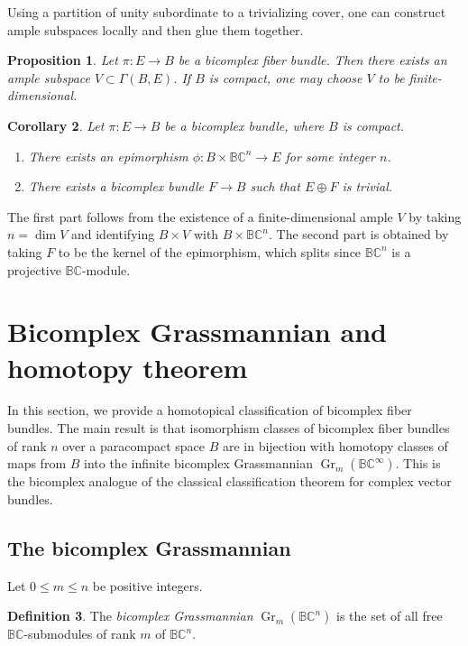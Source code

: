 \documentclass[11pt]{amsart}
\newcommand{\BC}{\mathbb{BC}}       %
\newcommand{\Gr}{\operatorname{Gr}}
\newtheorem{prop}{Proposition}[section]   %
\newtheorem{cor}[prop]{Corollary}         %
\theoremstyle{definition}
\newtheorem{defn}[prop]{Definition}       %
\begin{document}
Using a partition of unity subordinate to a trivializing cover, one can construct ample subspaces locally and then glue them together.

\begin{prop}
    Let $\pi:E \to B$ be a bicomplex fiber bundle. Then there exists an ample subspace $V \subset \Gamma(B,E)$. If $B$ is compact, one may choose $V$ to be finite-dimensional.
\end{prop}

\begin{cor}\label{cor:epimorphism}
    Let $\pi:E \to B$ be a bicomplex bundle, where $B$ is compact.
    \begin{enumerate}
        \item There exists an epimorphism $\phi:B \times \BC^n \to E$ for some integer $n$.
        \item There exists a bicomplex bundle $F \to B$ such that $E \oplus F$ is trivial.
    \end{enumerate}
\end{cor}

The first part follows from the existence of a finite-dimensional ample $V$ by taking $n = \dim V$ and identifying $B \times V$ with $B \times \BC^n$. The second part is obtained by taking $F$ to be the kernel of the epimorphism, which splits since $\BC^n$ is a projective $\BC$-module.


\section{Bicomplex Grassmannian and homotopy theorem}

In this section, we provide a homotopical classification of bicomplex fiber bundles. The main result is that isomorphism classes of bicomplex fiber bundles of rank $n$ over a paracompact space $B$ are in bijection with homotopy classes of maps from $B$ into the infinite bicomplex Grassmannian $\Gr_m(\BC^\infty)$. This is the bicomplex analogue of the classical classification theorem for complex vector bundles.

\subsection{The bicomplex Grassmannian}

Let $0\leq m \le n$ be positive integers.

\begin{defn}
    The \emph{bicomplex Grassmannian} $\Gr_m(\BC^n)$ is the set of all free $\BC$-submodules of rank $m$ of $\BC^n$.
\end{defn}
\end{document}

